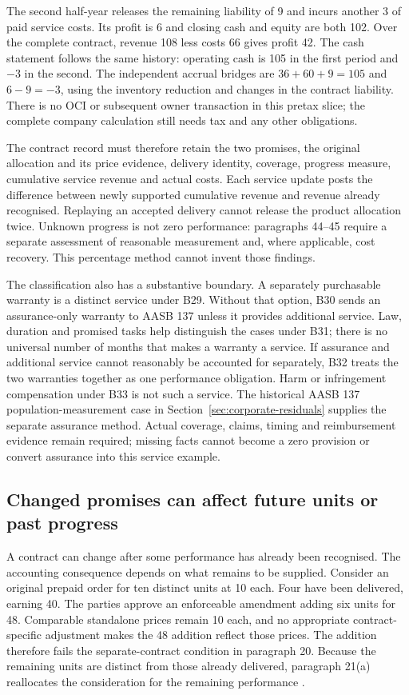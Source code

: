 The second half-year releases the remaining liability of 9 and incurs another
3 of paid service costs. Its profit is 6 and closing cash and equity are both
102. Over the complete contract, revenue 108 less costs 66 gives profit 42.
The cash statement follows the same history: operating cash is 105 in the
first period and $-3$ in the second. The independent accrual bridges are
$36+60+9=105$ and $6-9=-3$, using the inventory reduction and changes in the
contract liability. There is no OCI or subsequent owner transaction in this
pretax slice; the complete company calculation still needs tax and any other
obligations.

The contract record must therefore retain the two promises, the original
allocation and its price evidence, delivery identity, coverage, progress
measure, cumulative service revenue and actual costs. Each service update
posts the difference between newly supported cumulative revenue and revenue
already recognised. Replaying an accepted delivery cannot release the product
allocation twice. Unknown progress is not zero performance: paragraphs 44--45
require a separate assessment of reasonable measurement and, where applicable,
cost recovery. This percentage method cannot invent those findings.

The classification also has a substantive boundary. A separately purchasable
warranty is a distinct service under B29. Without that option, B30 sends an
assurance-only warranty to AASB 137 unless it provides additional service.
Law, duration and promised tasks help distinguish the cases under B31; there
is no universal number of months that makes a warranty a service. If assurance
and additional service cannot reasonably be accounted for separately, B32
treats the two warranties together as one performance obligation. Harm or
infringement compensation under B33 is not such a service. The historical
AASB 137 population-measurement case in Section~\ref{sec:corporate-residuals}
supplies the separate assurance method. Actual coverage, claims, timing and
reimbursement evidence remain required; missing facts cannot become a zero
provision or convert assurance into this service example.

\subsection{Changed promises can affect future units or past progress}
\label{sec:customer-modification}

A contract can change after some performance has already been recognised.
The accounting consequence depends on what remains to be supplied. Consider
an original prepaid order for ten distinct units at 10 each. Four have been
delivered, earning 40. The parties approve an enforceable amendment adding
six units for 48. Comparable standalone prices remain 10 each, and no
appropriate contract-specific adjustment makes the 48 addition reflect
those prices. The addition therefore fails the separate-contract condition
in paragraph 20. Because the remaining units are distinct from those already
delivered, paragraph 21(a) reallocates the consideration for the remaining
performance \citep{aasb15dated}.

